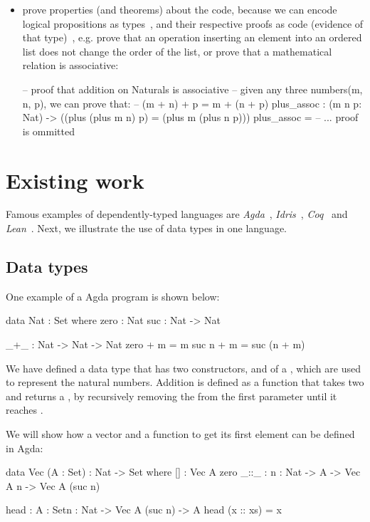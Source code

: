 \begin{itemize}
       \item prove properties (and theorems) about the code, because we can encode logical propositions as types~\cite{nlab:propositions-as-types}, and their respective proofs as code (evidence of that type)~\cite{nlab:proofs-as-programs}, e.g. prove that an operation inserting an element into an ordered list does not change the order of the list, or prove that a mathematical relation is associative:
       \begin{piforall}
-- proof that addition on Naturals is associative
-- given any three numbers(m, n, p), we can prove that:
-- (m + n) + p = m + (n + p)
plus_assoc : (m n p: Nat) -> ((plus (plus m n) p) = (plus m (plus n p)))
plus_assoc = -- ... proof is ommitted
       \end{piforall}

\end{itemize}

\section{Existing work}
Famous examples of dependently-typed languages are \emph{Agda}~\cite{agda}, \emph{Idris}~\cite{idris}, \emph{Coq}~\cite{coq} and \emph{Lean}~\cite{lean}. Next, we illustrate the use of data types in one language.

\subsection{Data types}
One example of a Agda program is shown below:
\begin{piforall}
data Nat : Set where
       zero : Nat
       suc : Nat -> Nat

_+_ : Nat -> Nat -> Nat
zero + m = m
suc n + m = suc (n + m)
\end{piforall}

We have defined a data type  that has two constructors,  and  of a , which are used to represent the natural numbers.
Addition is defined as a function that takes two  and returns a , by recursively removing the  from the first parameter until it reaches .

We will show how a vector and a function to get its first element can be defined in Agda:

\begin{piforall}
data Vec (A : Set) : Nat -> Set where
       [] : Vec A zero
       _::_ : {n : Nat} -> A -> Vec A n -> Vec A (suc n)

head : {A : Set}{n : Nat} -> Vec A (suc n) -> A
head (x :: xs) = x
\end{piforall}

